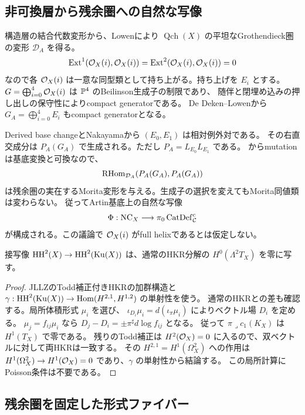 \subsection{非可換層から残余圏への自然な写像}

構造層の結合代数変形から、Lowen\cite[Theorem 3.26]{LowenPre}により
$\operatorname{Qch}(X)$ の平坦なGrothendieck圏の変形 $\mathcal D_A$ を得る。
\[
 \operatorname{Ext}^1(\mathcal O_X(i),\mathcal O_X(i))=
 \operatorname{Ext}^2(\mathcal O_X(i),\mathcal O_X(i))=0
\]
なので各 $\mathcal O_X(i)$ は一意な同型類として持ち上がる。持ち上げを $E_i$ とする。
$G=\bigoplus_{i=0}^4\mathcal O_X(i)$ は $\mathbb P^4$ のBeilinson生成子の制限であり、
随伴と閉埋め込みの押し出しの保守性によりcompact generatorである。
De Deken--Lowen\cite[Propositions 5.8--5.10]{DDL}から
$G_A=\bigoplus_{i=0}^4E_i$ もcompact generatorとなる。

Derived base changeとNakayamaから $(E_0,E_1)$ は相対例外対である。
その右直交成分は $P_A(G_A)$ で生成される。ただし
$P_A=L_{E_0}L_{E_1}$ である。
\cite[Lemma 5.14]{DDL}からmutationは基底変換と可換なので、
\[
 \operatorname{RHom}_{\mathcal D_A}(P_A(G_A),P_A(G_A))
\]
は残余圏の実在するMorita変形を与える。生成子の選択を変えてもMorita同値類は変わらない。
従ってArtin基底上の自然な写像
\[
 \Phi:\operatorname{NC}_X\longrightarrow\pi_0\operatorname{CatDef}^c_{\mathcal C}
\]
が構成される。この議論で $\mathcal O_X(i)$ がfull helixであるとは仮定しない。

\begin{lemma}\label{lem:bivector-zero}
接写像 $\operatorname{HH}^2(X)\to\operatorname{HH}^2(\operatorname{Ku}(X))$ は、通常のHKR分解の
$H^0(\Lambda^2T_X)$ を零に写す。
\end{lemma}
\begin{proof}
JLLZ\cite[Theorems 3.10, 4.4(2)]{JLLZ}のTodd補正付きHKRの加群構造と
$\gamma:\operatorname{HH}^2(\operatorname{Ku}(X))\to\operatorname{Hom}(H^{2,1},H^{1,2})$ の単射性を使う。
通常のHKRとの差も確認する。局所体積形式 $\mu_i$ を選び、
$\iota_{D_i}\mu_i=d(\iota_\pi\mu_i)$ によりベクトル場 $D_i$ を定める。
$\mu_j=f_{ij}\mu_i$ なら $D_j-D_i=\pm\pi^\sharp d\log f_{ij}$ となる。
従って $\pi\lrcorner c_1(K_X)$ は $H^1(T_X)$ で零である。
残りのTodd補正は $H^2(\mathcal O_X)=0$ に入るので、双ベクトルに対して両HKRは一致する。
その $H^{2,1}=H^1(\Omega_X^2)$ への作用は
$H^1(\Omega_X^2)\to H^1(\mathcal O_X)=0$ であり、$\gamma$ の単射性から結論する。
この局所計算にPoisson条件は不要である。
\end{proof}

\subsection{残余圏を固定した形式ファイバー}

